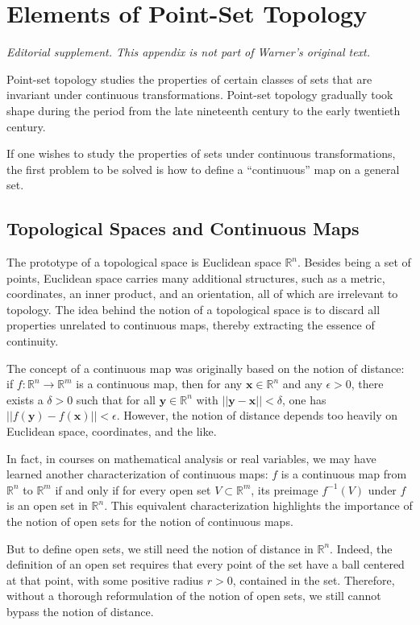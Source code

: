 \chapter{Elements of Point-Set Topology}
\label{ch:topology}
\noindent\emph{Editorial supplement. This appendix is not part of Warner's original text.}
\medskip

Point-set topology studies the properties of certain classes of sets that are
invariant under continuous transformations. Point-set topology gradually took
shape during the period from the late nineteenth century to the early
twentieth century.

If one wishes to study the properties of sets under continuous
transformations, the first problem to be solved is how to define a
``continuous'' map on a general set.

\section{Topological Spaces and Continuous Maps}
The prototype of a topological space is Euclidean space $\mathbb{R}^n$.
Besides being a set of points, Euclidean space carries many additional
structures, such as a metric, coordinates, an inner product, and an
orientation, all of which are irrelevant to topology. The idea behind the
notion of a topological space is to discard all properties unrelated to
continuous maps, thereby extracting the essence of continuity.

The concept of a continuous map was originally based on the notion of
distance: if $f:\mathbb{R}^n\to\mathbb{R}^m$ is a continuous map, then for
any $\mathbf{x}\in\mathbb{R}^n$ and any $\epsilon>0$, there exists a
$\delta >0$ such that for all $\mathbf{y}\in\mathbb{R}^n$ with
$||\mathbf{y}-\mathbf{x}||<\delta$, one has
$||f(\mathbf{y})-f(\mathbf{x})||<\epsilon$. However, the notion of distance
depends too heavily on Euclidean space, coordinates, and the like.

In fact, in courses on mathematical analysis or real variables, we may have
learned another characterization of continuous maps: $f$ is a continuous map
from $\mathbb{R}^n$ to $\mathbb{R}^m$ if and only if for every open set
$V\subset\mathbb{R}^m$, its preimage $f^{-1}(V)$ under $f$ is an open set in
$\mathbb{R}^n$. This equivalent characterization highlights the importance of
the notion of open sets for the notion of continuous maps.

But to define open sets, we still need the notion of distance in
$\mathbb{R}^n$. Indeed, the definition of an open set requires that every
point of the set have a ball centered at that point, with some positive radius
$r>0$, contained in the set. Therefore, without a thorough reformulation of
the notion of open sets, we still cannot bypass the notion of distance.

